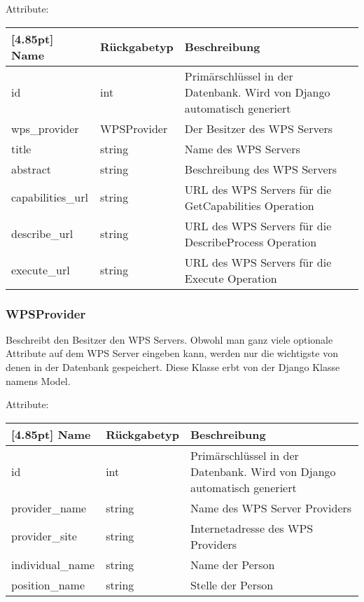 			Attribute:
			\begin{center}
				\setlength\tabcolsep{5pt}
				\renewcommand{\arraystretch}{1.5}
				
				\begin{tabularx}{\textwidth}{|l|l|X|}
					\hline
					\rowcolor[gray]{0.75}[4.85pt]
					Name & Rückgabetyp & Beschreibung \\ \hline 
					id & int & Primärschlüssel in der Datenbank. Wird von Django automatisch generiert \\ \hline
					wps\_provider & WPSProvider & Der Besitzer des WPS Servers \\ \hline
					title & string & Name des WPS Servers \\ \hline
					abstract & string & Beschreibung des WPS Servers \\ \hline
					capabilities\_url & string & URL des WPS Servers für die GetCapabilities Operation \\ \hline
					describe\_url & string & URL des WPS Servers für die DescribeProcess Operation \\ \hline
					execute\_url & string & URL des WPS Servers für die Execute Operation \\ \hline
					
				\end{tabularx}
			\end{center}
        \subsubsection{WPSProvider}
			Beschreibt den Besitzer den WPS Servers. Obwohl man ganz viele optionale Attribute auf dem WPS Server eingeben kann, werden nur die wichtigste von denen in der Datenbank gespeichert. \newline
			Diese Klasse erbt von der Django Klasse namens \glqq Model\grqq .
			
			Attribute:
			\begin{center}
				\setlength\tabcolsep{5pt}
				\renewcommand{\arraystretch}{1.5}
				
				\begin{tabularx}{\textwidth}{|l|l|X|}
					\hline
					\rowcolor[gray]{0.75}[4.85pt]
					Name & Rückgabetyp & Beschreibung \\ \hline 
					id & int & Primärschlüssel in der Datenbank. Wird von Django automatisch generiert \\ \hline
					provider\_name & string & Name des WPS Server Providers\\ \hline
					provider\_site & string & Internetadresse des WPS Providers \\ \hline
					individual\_name & string & Name der Person\\ \hline
					position\_name & string & Stelle der Person \\ \hline
				\end{tabularx}
			\end{center}

